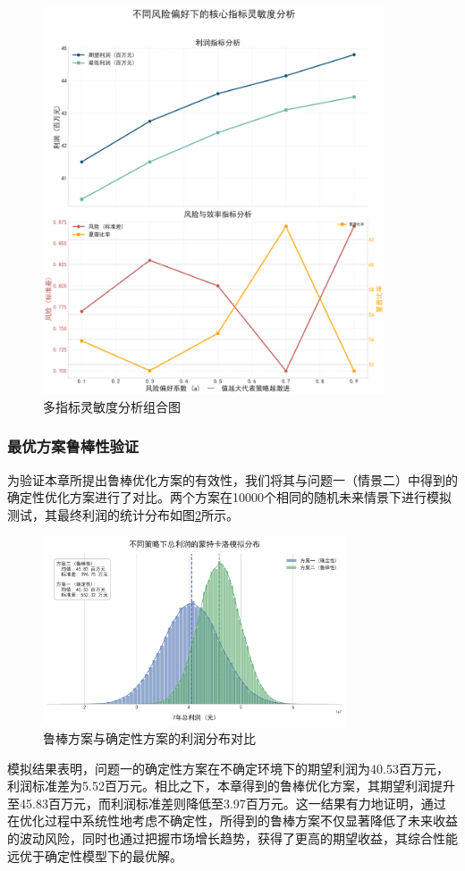 \begin{figure}[H]
    \centering
    \includegraphics[width=0.9\textwidth]{figs/4问题二/多指标灵敏度分析组合图.png}
    \caption{多指标灵敏度分析组合图}
    \label{fig:sensitivity_combo}
\end{figure}

\subsubsection{最优方案鲁棒性验证}
为验证本章所提出鲁棒优化方案的有效性，我们将其与问题一（情景二）中得到的确定性优化方案进行了对比。两个方案在10000个相同的随机未来情景下进行模拟测试，其最终利润的统计分布如图\ref{fig:robustness_dist}所示。

\begin{figure}[H]
    \centering
    \includegraphics[width=0.8\textwidth]{figs/4问题二/鲁棒性蒙德卡诺模拟分布图.png}
    \caption{鲁棒方案与确定性方案的利润分布对比}
    \label{fig:robustness_dist}
\end{figure}

模拟结果表明，问题一的确定性方案在不确定环境下的期望利润为40.53百万元，利润标准差为5.52百万元。相比之下，本章得到的鲁棒优化方案，其期望利润提升至45.83百万元，而利润标准差则降低至3.97百万元。这一结果有力地证明，通过在优化过程中系统性地考虑不确定性，所得到的鲁棒方案不仅显著降低了未来收益的波动风险，同时也通过把握市场增长趋势，获得了更高的期望收益，其综合性能远优于确定性模型下的最优解。

